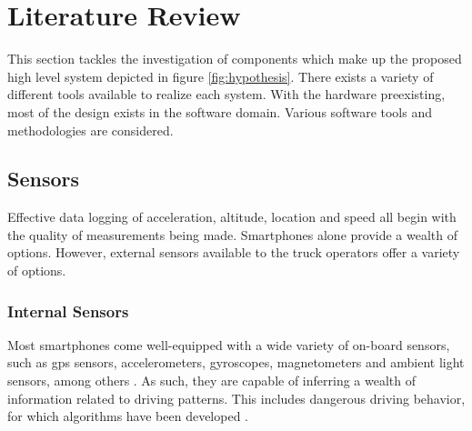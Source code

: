 \section{Literature Review}
This section tackles the investigation of components which make up the proposed high level system depicted in figure \ref{fig:hypothesis}.
There exists a variety of different tools available to realize each system.
With the hardware preexisting, most of the design exists in the software domain.
Various software tools and methodologies are considered.

\subsection{Sensors}
Effective data logging of acceleration, altitude, location and speed all begin with the quality of measurements being made.
Smartphones alone provide a wealth of options.
However, external sensors available to the truck operators offer a variety of options.

\subsubsection{Internal Sensors}
Most smartphones come well-equipped with a wide variety of on-board sensors, such as \ac{gps} sensors, accelerometers, gyroscopes, magnetometers and ambient light sensors, among others \cite{majumder2019smartphone}.
As such, they are capable of inferring a wealth of information related to driving patterns.
This includes dangerous driving behavior, for which algorithms have been developed \cite{li2016dangerous}.

